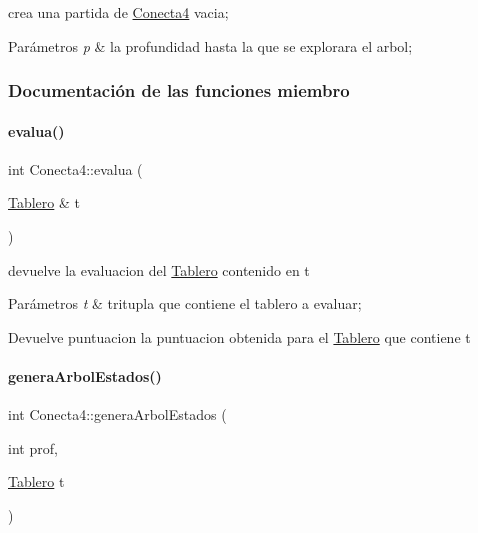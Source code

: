 crea una partida de \hyperlink{classConecta4}{Conecta4} vacia; 


\begin{DoxyParams}{Parámetros}
{\em p} & la profundidad hasta la que se explorara el arbol; \\
\hline
\end{DoxyParams}


\subsubsection{Documentación de las funciones miembro}
\hypertarget{classConecta4_acb02a160b22863c2f473b408328d9f7b}{}\label{classConecta4_acb02a160b22863c2f473b408328d9f7b} 
\paragraph{\texorpdfstring{evalua()}{evalua()}}
{\footnotesize\ttfamily int Conecta4\+::evalua (\begin{DoxyParamCaption}\item[{\hyperlink{classTablero}{Tablero} \&}]{t }\end{DoxyParamCaption})\hspace{0.3cm}{\ttfamily [private]}}



devuelve la evaluacion del \hyperlink{classTablero}{Tablero} contenido en t 


\begin{DoxyParams}{Parámetros}
{\em t} & tritupla que contiene el tablero a evaluar; \\
\hline
\end{DoxyParams}
\begin{DoxyReturn}{Devuelve}
puntuacion la puntuacion obtenida para el \hyperlink{classTablero}{Tablero} que contiene t 
\end{DoxyReturn}
\hypertarget{classConecta4_ab72f5bb472cb8784cddb0b4b09c13dac}{}\label{classConecta4_ab72f5bb472cb8784cddb0b4b09c13dac} 
\paragraph{\texorpdfstring{genera\+Arbol\+Estados()}{generaArbolEstados()}}
{\footnotesize\ttfamily int Conecta4\+::genera\+Arbol\+Estados (\begin{DoxyParamCaption}\item[{int}]{prof,  }\item[{\hyperlink{classTablero}{Tablero}}]{t }\end{DoxyParamCaption})}



